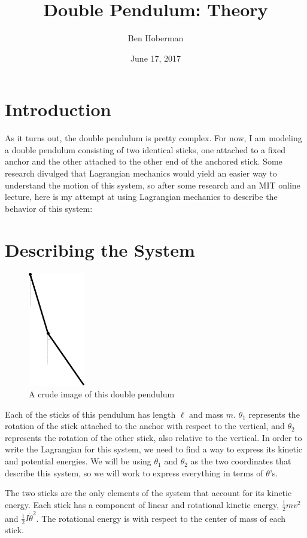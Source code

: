\documentclass[]{article}
\title{Double Pendulum: Theory}
\author{Ben Hoberman}
\begin{document}
	
\date{June 17, 2017}
\maketitle

\newcommand{\lagr}{\mathcal{L}}

\section{Introduction}
As it turns out, the double pendulum is pretty complex. For now, I am modeling a double pendulum consisting of two identical sticks, one attached to a fixed anchor and the other attached to the other end of the anchored stick. Some research divulged that Lagrangian mechanics would yield an easier way to understand the motion of this system, so after some research and an MIT online lecture, here is my attempt at using Lagrangian mechanics to describe the behavior of this system:

\section{Describing the System}
\begin{figure}[h!]
	\includegraphics[height=5cm]{situation}
	\caption{A crude image of this double pendulum}
\end{figure}
Each of the sticks of this pendulum has length $\ell$ and mass $m$. $\theta_1$ represents the rotation of the stick attached to the anchor with respect to the vertical, and $\theta_2$ represents the rotation of the other stick, also relative to the vertical. In order to write the Lagrangian for this system, we need to find a way to express its kinetic and potential energies. We will be using $\theta_1$ and $\theta_2$ as the two coordinates that describe this system, so we will work to express everything in terms of $\theta$'s.

The two sticks are the only elements of the system that account for its kinetic energy. Each stick has a component of linear and rotational kinetic energy, $\frac{1}{2}mv^2$ and $\frac{1}{2}I\dot{\theta}^2$. The rotational energy is with respect to the center of mass of each stick.
\end{document}
